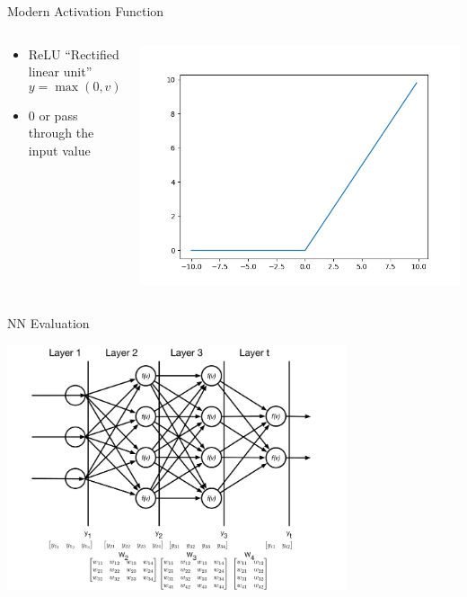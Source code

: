\documentclass[aspectratio=169]{beamer}
\begin{document}
\begin{frame}{Modern Activation Function}

\begin{columns}
\begin{column}{0.6\textwidth}
\begin{itemize}
		\item ReLU ``Rectified linear unit''
		$$y = \max(0, v)$$
		\item 0 or pass through the input value
\end{itemize}
\end{column}
\begin{column}{0.5\textwidth}
\includegraphics[width=1\textwidth]{lectFF/reLU.png}
\end{column}
\end{columns}

	\end{frame}
\begin{frame}{NN Evaluation}

\includegraphics[width=0.75\textwidth]{lectFF/nnEval.pdf}
\end{frame}
\end{document}
